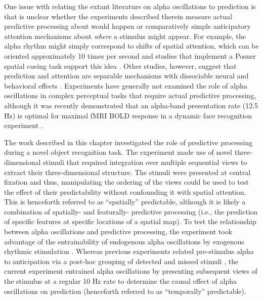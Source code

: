 \documentclass[dwyatte_dissertation.tex]{subfiles}
\begin{document}
One issue with relating the extant literature on alpha oscillations to prediction is that is unclear whether the experiments described therein measure actual predictive processing about  would happen or comparatively simple anticipatory attention mechanisms about \textit{where} a stimulus might appear. For example, the alpha rhythm might simply correspond to shifts of spatial attention, which can be oriented approximately 10 times per second \cite{VanRullenDubois11} and studies that implement a Posner spatial cueing task \cite{Posner80} support this idea \cite{CapotostoBabiloniRomaniEtAl09,BuschVanRullen10}. Other studies, however, suggest that prediction and attention are separable mechanisms with dissociable neural and behavioral effects \cite{KokRahnevJeheeEtAl12,WyartNobreSummerfield12,HorschigJensenVanSchouwenburgEtAl13}. Experiments have generally not examined the role of alpha oscillations in complex perceptual tasks that require actual predictive processing, although it was recently demonstrated that an alpha-band presentation rate (12.5 Hz) is optimal for maximal fMRI BOLD response in a dynamic face recognition experiment \cite{SchultzBrockhausBulthoffEtAl13}.

The work described in this chapter investigated the role of predictive processing during a novel object recognition task. The experiment made use of novel three-dimensional stimuli that required integration over multiple sequential views to extract their three-dimensional structure. The stimuli were presented at central fixation and thus, manipulating the ordering of the views could be used to test the effect of their predictability without confounding it with spatial attention. This is henceforth referred to as ``spatially'' predictable, although it is likely a combination of spatially- and featurally- predictive processing (i.e., the prediction of specific features at specific locations of a spatial map). To test the relationship between alpha oscillations and predictive processing, the experiment took advantage of the entrainability of endogenous alpha oscillations by exogenous rhythmic stimulation \cite{SchroederLakatosKajikawaEtAl08,CalderoneLakatosButlerEtAlInPress}. Whereas previous experiments related pre-stimulus alpha to  anticipation via a post-hoc grouping of detected and missed stimuli \cite{MathewsonGrattonFabianiEtAl09,BuschDuboisVanRullen09}, the current experiment entrained alpha oscillations by presenting subsequent views of the stimulus at a regular 10 Hz rate to determine the causal effect of alpha oscillations on prediction (henceforth referred to as ``temporally'' predictable).
\end{document}
